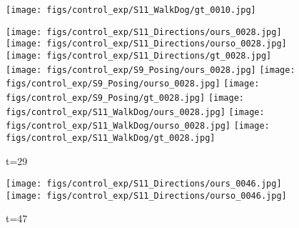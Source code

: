 \documentclass{article}
\begin{document}
\begin{appendix}
\begin{figure*}[!thbp]
\begin{subfigure}{0.12\linewidth}
  		\texttt{[image: figs/control\_exp/S11\_WalkDog/gt\_0010.jpg]}
	\end{subfigure} 
    \begin{subfigure}{0.12\linewidth}
        \caption*{t=29}
        \vspace{-7pt}
	    \texttt{[image: figs/control\_exp/S11\_Directions/ours\_0028.jpg]}
	    \texttt{[image: figs/control\_exp/S11\_Directions/ourso\_0028.jpg]}
	    \vspace{.2cm}
  		\texttt{[image: figs/control\_exp/S11\_Directions/gt\_0028.jpg]}
  		\texttt{[image: figs/control\_exp/S9\_Posing/ours\_0028.jpg]}
  		\texttt{[image: figs/control\_exp/S9\_Posing/ourso\_0028.jpg]}
  		\vspace{.2cm}
  		\texttt{[image: figs/control\_exp/S9\_Posing/gt\_0028.jpg]}
  		\texttt{[image: figs/control\_exp/S11\_WalkDog/ours\_0028.jpg]}
  		\texttt{[image: figs/control\_exp/S11\_WalkDog/ourso\_0028.jpg]}
  		\vspace{.2cm}
  		\texttt{[image: figs/control\_exp/S11\_WalkDog/gt\_0028.jpg]}
	\end{subfigure} 
    \begin{subfigure}{0.12\linewidth}
        \caption*{t=47}
        \vspace{-7pt}
	    \texttt{[image: figs/control\_exp/S11\_Directions/ours\_0046.jpg]}
	    \texttt{[image: figs/control\_exp/S11\_Directions/ourso\_0046.jpg]}
	    \vspace{.2cm}

\end{subfigure}
\end{figure*}
\end{appendix}
\end{document}
